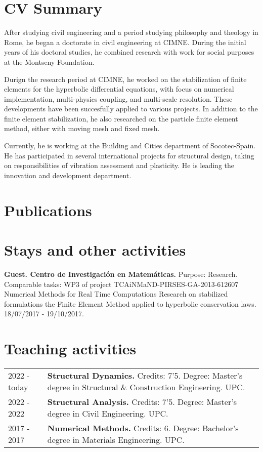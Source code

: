 \documentclass[12pt]{article}
\begin{document}
\section{CV Summary}
After studying civil engineering and a period studying philosophy and theology in Rome, he began
a doctorate in civil engineering at CIMNE. During the initial years of his doctoral studies, he combined
research with work for social purposes at the Montseny Foundation.

Durign the research period at CIMNE, he worked on the stabilization of finite elements for the hyperbolic
differential equations, with focus on numerical implementation, multi-physics coupling, and multi-scale
resolution. These developments have been succesfully applied to various projects. In addition to
the finite element stabilization, he also researched on the particle finite element method, either
with moving mesh and fixed mesh.

Currently, he is working at the Building and Cities department of Socotec-Spain. He has participated
in several international projects for structural design, taking on responsibilities of vibration
assessment and plasticity. He is leading the innovation and development department.


\section{Publications}
\nocite{*}
\printbibliography[heading={subbibliography}, title={Journal papers}, type=article]
\printbibliography[heading={subbibliography}, title={Theses}, type=thesis]
\printbibliography[heading={subbibliography}, title={Conferences}, type=inproceedings]


\section{Stays and other activities}
\textbf{Guest. Centro de Investigación en Matemáticas.} Purpose: Research. Comparable tasks: WP3 of project
TCAiNMaND-PIRSES-GA-2013-612607 Numerical Methods for Real Time Computations Research on stabilized
formulations the Finite Element Method applied to hyperbolic conservation laws. 18/07/2017 - 19/10/2017.


\section{Teaching activities}
\begin{tabularx}{\linewidth}{lX}
    2022 - today &
    \textbf{Structural Dynamics.} Credits: 7'5. Degree: Master's degree in Structural \& Construction Engineering. UPC. \\

    2022 - 2022 &
    \textbf{Structural Analysis.} Credits: 7'5. Degree: Master's degree in Civil Engineering. UPC. \\

    2017 - 2017 &
    \textbf{Numerical Methods.} Credits: 6. Degree: Bachelor's degree in Materials Engineering. UPC. \\
\end{tabularx}
\end{document}
